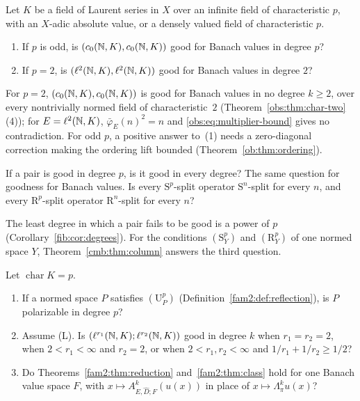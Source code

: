 \begin{question}\label{q:quest:residue}
Let $K$ be a field of Laurent series in $X$ over an infinite field of characteristic $p$, with an $X$-adic absolute
value, or a densely valued field of characteristic $p$.
\begin{enumerate}
\item If $p$ is odd, is $(c_0(\mathbb N,K),c_0(\mathbb N,K))$ good for Banach values in degree $p$?
\item If $p=2$, is $(\ell^2(\mathbb N,K),\ell^2(\mathbb N,K))$ good for Banach values in degree $2$?
\end{enumerate}
\end{question}

For $p=2$, $(c_0(\mathbb N,K),c_0(\mathbb N,K))$ is good for Banach values in no degree $k\ge2$, over every nontrivially normed field
of characteristic~$2$ (Theorem~\ref{obs:thm:char-two}(4)); for $E=\ell^2(\mathbb N,K)$, $\bar\varphi_E(n)^2=n$ and
\eqref{obs:eq:multiplier-bound} gives no contradiction. For odd $p$, a positive answer to~(1) needs a zero-diagonal
correction making the ordering lift bounded (Theorem~\ref{ob:thm:ordering}).

\begin{question}\label{q:quest:height}
If a pair is good in degree $p$, is it good in every degree? The same question for goodness for Banach values. Is every
$\mathrm S^p$-split operator $\mathrm S^n$-split for every $n$, and every $\mathrm R^p$-split operator
$\mathrm R^n$-split for every $n$?
\end{question}

The least degree in which a pair fails to be good is a power of $p$ (Corollary~\ref{fib:cor:degrees}). For the
conditions $(\mathrm S^p_Y)$ and $(\mathrm R^p_Y)$ of one normed space $Y$, Theorem~\ref{cmb:thm:column} answers the third question.

\begin{question}\label{q:quest:pairs}
Let $\operatorname{char}K=p$.
\begin{enumerate}
\item If a normed space $P$ satisfies $(\mathrm U^p_P)$ (Definition~\ref{fam2:def:reflection}), is $P$ polarizable in
degree $p$?
\item Assume \textup{(L)}. Is $(\ell^{r_1}(\mathbb N,K);\ell^{r_2}(\mathbb N,K))$ good in degree $k$ when $r_1=r_2=2$, when
$2<r_1<\infty$ and $r_2=2$, or when $2<r_1,r_2<\infty$ and $1/r_1+1/r_2\ge1/2$?
\item Do Theorems~\ref{fam2:thm:reduction} and~\ref{fam2:thm:class} hold for one Banach value space $F$, with
$x\mapsto A^k_{E,\widehat D;F}(u(x))$ in place of $x\mapsto\Lambda^k_\pi u(x)$?
\end{enumerate}
\end{question}

